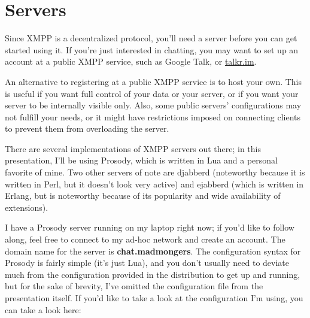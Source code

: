 \section{Servers}

\pause

Since XMPP is a decentralized protocol, you'll need a server before you can get started using it.
If you're just interested in chatting, you may want to set up an account at a public XMPP service,
such as Google Talk, or \url{talkr.im}.

\pause
An alternative to registering at a public XMPP service is to host your own.  This is useful if you want
full control of your data or your server, or if you want your server to be internally visible only.  Also,
some public servers' configurations may not fulfill your needs, or it might have restrictions imposed on
connecting clients to prevent them from overloading the server.

\pause
There are several implementations of XMPP servers out there; in this presentation, I'll be using Prosody,
which is written in Lua and a personal favorite of mine.  Two other servers of note are djabberd (noteworthy
because it is written in Perl, but it doesn't look very active) and ejabberd (which is written in Erlang, but is
noteworthy because of its popularity and wide availability of extensions).

\pause
I have a Prosody server running on my laptop right now; if you'd like to follow along, feel free to connect to my ad-hoc
network and create an account.  The domain name for the server is \textbf{chat.madmongers}.  The configuration syntax for Prosody is
fairly simple (it's just Lua), and you don't usually need to deviate much from the configuration provided in the distribution to
get up and running, but for the sake of brevity, I've omitted the configuration file from the presentation itself.  If you'd
like to take a look at the configuration I'm using, you can take a look here:

\pause
{}
